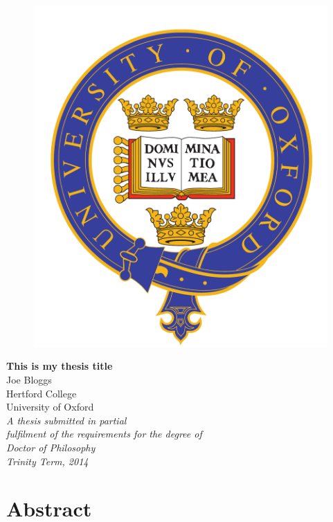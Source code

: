 \begin{titlepage}
   \centering
   \begin{figure}
      \centering
      \includegraphics[scale=0.4]{oxford_logo-eps-converted-to.pdf}
   \end{figure}
   {\LARGE{\textbf{This is my thesis title}}}\\ 
    \vspace{2cm}
   {\Large{Joe Bloggs}}\\
   {\Large{Hertford College}}\\
   {\Large{University of Oxford}}\\
   \vspace{2cm}   
   {\Large{\textit{A thesis submitted in partial \\ fulfilment of the requirements for the degree of\\ Doctor of Philosophy}}}\\
   {\Large{\textit{Trinity Term, 2014}}}
\end{titlepage}

\newpage
\chapter*{Abstract} %
\thispagestyle{plain}
 \setcounter{page}{1}

